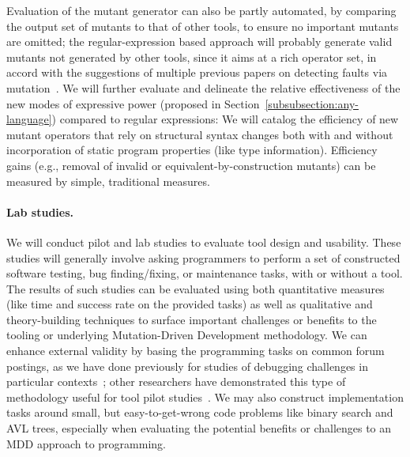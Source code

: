 Evaluation of the mutant generator can also be partly automated, by
comparing the output set of mutants to that of other tools, to ensure
no important mutants are omitted; the regular-expression based
approach will probably generate valid mutants not generated by other
tools, since it aims at a rich operator set, in accord with the
suggestions of multiple previous papers on detecting faults via
mutation~\cite{just2014mutants,gopinath2017mutation}.
We will further evaluate and delineate the relative effectiveness of the new modes of expressive power (proposed in Section~\ref{subsubsection:any-language}) compared to regular expressions: We will catalog the efficiency of new mutant operators that rely on structural syntax changes both with and without incorporation of static program properties (like type information).
Efficiency
gains (e.g., removal of invalid or equivalent-by-construction mutants) can
be measured by simple, traditional measures.

\paragraph{Lab studies.}
We will conduct pilot and lab studies to evaluate tool design
and usability.
These studies will generally involve asking programmers to perform a set of
constructed software testing, bug finding/fixing, or maintenance tasks, with or
without a tool.  The results of such studies can be evaluated using both
quantitative measures (like time and success rate on the provided tasks) as well
as qualitative and theory-building techniques to surface
important challenges or benefits to the tooling or underlying Mutation-Driven
Development methodology.  We can enhance external validity by basing the
programming tasks on common forum postings, as we have done previously for
studies of debugging challenges in particular
contexts~\cite{frameworkDebugging}; other researchers have demonstrated this
type of methodology useful for tool pilot studies~\cite{sunshineDocumentation}.
We may also construct implementation tasks around small, but easy-to-get-wrong
code problems like binary search and AVL trees, especially when evaluating the
potential benefits or challenges to an MDD approach to programming.

